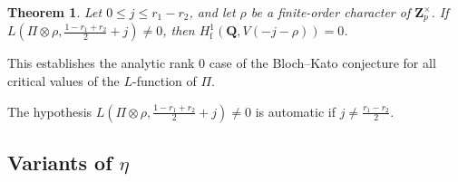 \documentclass[cjm]{ipart}
\theoremstyle{plain}
\newtheorem{theorem}{Theorem}[subsection]
\theoremstyle{remark}
\newcommand{\QQ}{\mathbf{Q}}
\newcommand{\Zp}{\mathbf{Z}_p}
\numberwithin{equation}{subsection}
\renewcommand{\le}{\leqslant}
\begin{document}
  \begin{theorem}
   Let $0 \le j \le r_1 - r_2$, and let $\rho$ be a finite-order character of $\Zp^\times$. If $L(\Pi \otimes \rho, \tfrac{1-r_1+r_2}{2} + j) \ne 0$, then $H^1_{\mathrm{f}}(\QQ, V(-j-\rho)) = 0$.
  \end{theorem}

  This establishes the analytic rank 0 case of the Bloch--Kato conjecture for all critical values of the $L$-function of $\Pi$.

  \begin{note}
   The hypothesis $L(\Pi \otimes \rho, \tfrac{1-r_1+r_2}{2} + j) \ne 0$ is automatic if $j \ne \tfrac{r_1 - r_2}{2}$.
  \end{note}



\subsection*{Variants of \texorpdfstring{$\eta$}{eta}}
\label{sect:variantsofeta}
 \vspace{1ex}
\end{document}
